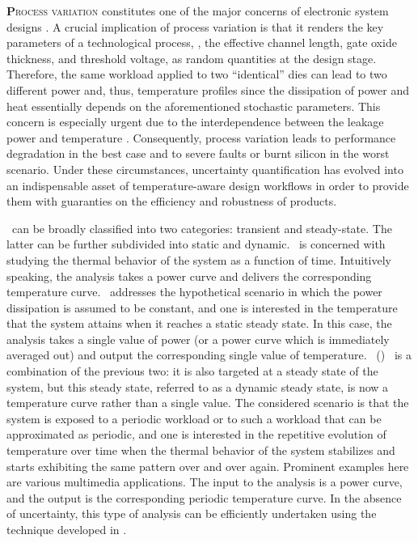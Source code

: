 \lettrine[findent=0.4em, nindent=0em]{\textbf{P}}{rocess variation} constitutes one of the major concerns of electronic system designs \cite{srivastava2010}.
A crucial implication of process variation is that it renders the key parameters of a technological process, \eg, the effective channel length, gate oxide thickness, and threshold voltage, as random quantities at the design stage.
Therefore, the same workload applied to two ``identical'' dies can lead to two different power and, thus, temperature profiles since the dissipation of power and heat essentially depends on the aforementioned stochastic parameters.
This concern is especially urgent due to the interdependence between the leakage power and temperature \cite{liu2007}.
Consequently, process variation leads to performance degradation in the best case and to severe faults or burnt silicon in the worst scenario.
Under these circumstances, uncertainty quantification \cite{maitre2010} has evolved into an indispensable asset of temperature-aware design workflows in order to provide them with guaranties on the efficiency and robustness of products.

\Ta\ can be broadly classified into two categories: transient and steady-state.
The latter can be further subdivided into static and dynamic.
\Tta\ is concerned with studying the thermal behavior of the system as a function of time.
Intuitively speaking, the analysis takes a power curve and delivers the corresponding temperature curve.
\Sssta\ addresses the hypothetical scenario in which the power dissipation is assumed to be constant, and one is interested in the temperature that the system attains when it reaches a static steady state.
In this case, the analysis takes a single value of power (or a power curve which is immediately averaged out) and output the corresponding single value of temperature.
\Dss\ (\DSS) \ta\ is a combination of the previous two: it is also targeted at a steady state of the system, but this steady state, referred to as a dynamic steady state, is now a temperature curve rather than a single value.
The considered scenario is that the system is exposed to a periodic workload or to such a workload that can be approximated as periodic, and one is interested in the repetitive evolution of temperature over time when the thermal behavior of the system stabilizes and starts exhibiting the same pattern over and over again.
Prominent examples here are various multimedia applications.
The input to the analysis is a power curve, and the output is the corresponding periodic temperature curve.
In the absence of uncertainty, this type of analysis can be efficiently undertaken using the technique developed in \cite{ukhov2012}.

